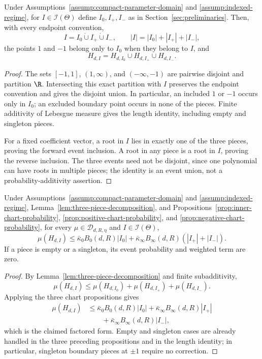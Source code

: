 \begin{lemma}
\label{lem:three-piece-decomposition}
Under Assumptions~\ref{assump:compact-parameter-domain} and
\ref{assump:indexed-regime}, for $I\in\mathcal I(\Theta)$ define
$I_0,I_+,I_-$ as in Section~\ref{sec:preliminaries}.  Then, with every
endpoint convention,
\[
I=I_0\mathbin{\dot\cup}I_+\mathbin{\dot\cup}I_-,
\qquad
|I|=|I_0|+|I_+|+|I_-|,
\]
the points $1$ and $-1$ belong only to $I_0$ when they belong to $I$, and
\[
H_{d,I}=H_{d,I_0}\cup H_{d,I_+}\cup H_{d,I_-}.
\]
\end{lemma}

\begin{proof}
The sets $[-1,1]$, $(1,\infty)$, and $(-\infty,-1)$ are pairwise disjoint
and partition $\R$.  Intersecting this exact partition with $I$ preserves
the endpoint convention and gives the disjoint union.  In particular, an
included $1$ or $-1$ occurs only in $I_0$; an excluded boundary point occurs
in none of the pieces.  Finite additivity of Lebesgue measure gives the
length identity, including empty and singleton pieces.

For a fixed coefficient vector, a root in $I$ lies in exactly one of the
three pieces, proving the forward event inclusion.  A root in any piece is a
root in $I$, proving the reverse inclusion.  The three events need not be
disjoint, since one polynomial can have roots in multiple pieces; the identity
is an event union, not a probability-additivity assertion.
\end{proof}

\begin{proposition}
\label{prop:weighted-chart-bound}
Under Assumptions~\ref{assump:compact-parameter-domain} and
\ref{assump:indexed-regime}, Lemma~\ref{lem:three-piece-decomposition}, and
Propositions~\ref{prop:inner-chart-probability},
\ref{prop:positive-chart-probability}, and
\ref{prop:negative-chart-probability}, for every
$\mu\in\mathcal D_{d,R,\eta}$ and $I\in\mathcal I(\Theta)$,
\[
\mu(H_{d,I})
\leq\bar\kappa_0B_0(d,R)|I_0|
 +\bar\kappa_\infty B_\infty(d,R)(|I_+|+|I_-|).
\]
If a piece is empty or a singleton, its event probability and weighted term
are zero.
\end{proposition}

\begin{proof}
By Lemma~\ref{lem:three-piece-decomposition} and finite subadditivity,
\[
\mu(H_{d,I})
\leq\mu(H_{d,I_0})+\mu(H_{d,I_+})+\mu(H_{d,I_-}).
\]
Applying the three chart propositions gives
\[
\begin{aligned}
\mu(H_{d,I})
&\leq\bar\kappa_0B_0(d,R)|I_0|
 +\bar\kappa_\infty B_\infty(d,R)|I_+|\\
&\qquad+\bar\kappa_\infty B_\infty(d,R)|I_-|,
\end{aligned}
\]
which is the claimed factored form.  Empty and singleton cases are already
handled in the three preceding propositions and in the length identity; in
particular, singleton boundary pieces at $\pm1$ require no correction.
\end{proof}

